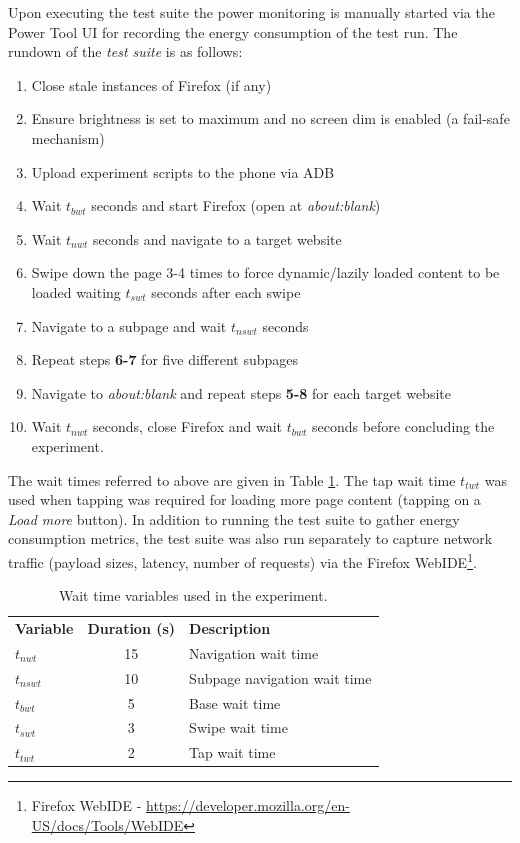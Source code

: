 \documentclass{article}
\begin{document}
Upon executing the test suite the power monitoring is manually started via the Power Tool UI for recording the energy consumption of the test run. The rundown of the \emph{test suite} is as follows:

\begin{enumerate}
    \item Close stale instances of Firefox (if any)
    \item Ensure brightness is set to maximum and no screen dim is enabled (a fail-safe mechanism)
    \item Upload experiment scripts to the phone via ADB
    \item Wait $t_{bwt}$ seconds and start Firefox (open at \emph{about:blank})
    \item Wait $t_{nwt}$ seconds and navigate to a target website
    \item Swipe down the page 3-4 times to force dynamic/lazily loaded content to be loaded waiting $t_{swt}$ seconds after each swipe
    \item Navigate to a subpage and wait $t_{nswt}$ seconds
    \item Repeat steps \textbf{6-7} for five different subpages
    \item Navigate to \emph{about:blank} and repeat steps \textbf{5-8} for each target website
    \item Wait $t_{nwt}$ seconds, close Firefox and wait $t_{bwt}$ seconds before concluding the experiment.
\end{enumerate}

The wait times referred to above are given in Table \ref{table:wait_times}. The tap wait time $t_{twt}$ was used when tapping was required for loading more page content (tapping on a \emph{Load more} button). In addition to running the test suite to gather energy consumption metrics, the test suite was also run separately to capture network traffic (payload sizes, latency, number of requests) via the Firefox WebIDE\footnote{Firefox WebIDE - \url{https://developer.mozilla.org/en-US/docs/Tools/WebIDE}}.

\begin{table}[h!]
    \centering
    \begin{tabular}{l|c|l|}
        \textbf{Variable} & \textbf{Duration (s)} & \textbf{Description} \\
        $t_{nwt}$   & 15    & Navigation wait time \\
        $t_{nswt}$  & 10    & Subpage navigation wait time \\
        $t_{bwt}$   & 5     & Base wait time \\
        $t_{swt}$   & 3     & Swipe wait time \\
        $t_{twt}$   & 2     & Tap wait time
    \end{tabular}
    \caption{Wait time variables used in the experiment.}
    \label{table:wait_times}
\end{table}
\end{document}
